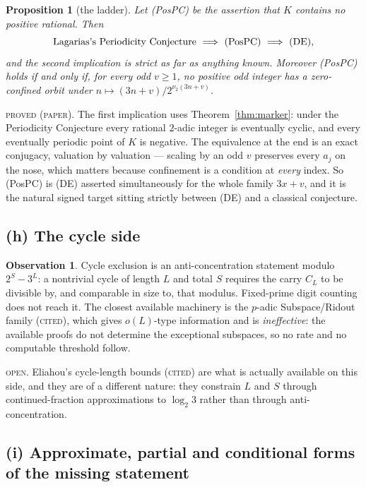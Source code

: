 \documentclass[11pt,reqno]{amsart}
\theoremstyle{plain}
\newtheorem{proposition}[theorem]{Proposition}
\theoremstyle{definition}
\newtheorem{observation}[theorem]{Observation}
\newcommand{\vt}{\nu_2}
\newcommand{\lab}[1]{\textnormal{\textsc{\small #1}}}
\begin{document}
\begin{proposition}[the ladder]\label{prop:ladder}
Let \textup{(PosPC)} be the assertion that $K$ contains no positive rational.
Then
\[
\text{Lagarias's Periodicity Conjecture}\ \Longrightarrow\ \textup{(PosPC)}
\ \Longrightarrow\ \textup{(DE)},
\]
and the second implication is strict as far as anything known. Moreover
\textup{(PosPC)} holds if and only if, for every odd $v\ge1$, no positive odd
integer has a zero-confined orbit under $n\mapsto(3n+v)/2^{\vt(3n+v)}$.
\end{proposition}
\lab{proved (paper)}. The first implication uses Theorem~\ref{thm:marker}: under
the Periodicity Conjecture every rational $2$-adic integer is eventually cyclic,
and every eventually periodic point of $K$ is negative. The equivalence at the
end is an exact conjugacy, valuation by valuation --- scaling by an odd $v$
preserves every $a_j$ on the nose, which matters because confinement is a
condition at \emph{every} index. So (PosPC) is (DE) asserted simultaneously for
the whole family $3x+v$, and it is the natural signed target sitting strictly
between (DE) and a classical conjecture.

\subsection*{(h) The cycle side}

\begin{observation}\label{obs:cycle}
Cycle exclusion is an anti-concentration statement modulo $2^{S}-3^{L}$: a
nontrivial cycle of length $L$ and total $S$ requires the carry $C_L$ to be
divisible by, and comparable in size to, that modulus. Fixed-prime digit counting
does not reach it. The closest available machinery is the $p$-adic
Subspace/Ridout family \cite{Ridout1958,Mahler1957} (\lab{cited}), which gives
$o(L)$-type information and is \emph{ineffective}: the available proofs do not
determine the exceptional subspaces, so no rate and no computable threshold
follow.
\end{observation}
\lab{open}. Eliahou's cycle-length bounds \cite{Eliahou1993} (\lab{cited}) are
what is actually available on this side, and they are of a different nature: they
constrain $L$ and $S$ through continued-fraction approximations to $\log_2 3$
rather than through anti-concentration.

\subsection*{(i) Approximate, partial and conditional forms of the missing statement}
\label{sub:approx}
\end{document}
